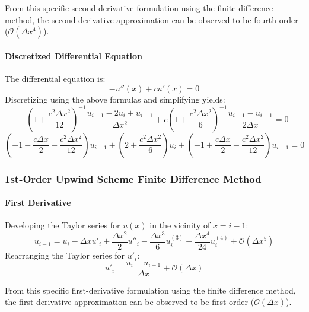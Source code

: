\documentclass[10pt, reqno]{article}		%
\numberwithin{equation}{section}
\begin{document}
From this specific second-derivative formulation using the finite difference method, the second-derivative approximation can be observed to be fourth-order ($\mathcal{O}(\Delta x^4)$).

\paragraph{Discretized Differential Equation}
The differential equation is:
\begin{equation}
- u''(x)+cu'(x)=0
\end{equation}
Discretizing using the above formulas and simplifying yields:
\begin{equation}
-\left(1 + \frac{c^2\Delta x^2}{12} \right)^{-1} \frac{u_{i+1} -2u_i + u_{i-1}}{\Delta x^2} + c\left(1 + \frac{c^2\Delta x^2}{6}\right)^{-1} \frac{u_{i+1} - u_{i-1}}{2\Delta x} = 0
\end{equation}
\begin{equation}
\left(-1-\frac{c\Delta x}{2}-\frac{c^2\Delta x^2}{12}\right)u_{i-1} + \left(2+\frac{c^2\Delta x^2}{6}\right)u_{i} + \left(-1+\frac{c\Delta x}{2}-\frac{c^2\Delta x^2}{12}\right)u_{i+1} = 0
\end{equation}

\subsubsection{1st-Order Upwind Scheme Finite Difference Method}

\paragraph{First Derivative}
Developing the Taylor series for $u(x)$ in the vicinity of $x = i-1$:
\begin{equation}
u_{i-1} = u_i - \Delta x u'_i + \frac{\Delta x^2}{2} u''_i - \frac{\Delta x^3}{6} u^{(3)}_i + \frac{\Delta x^4}{24} u^{(4)}_i + \mathcal{O}(\Delta x^5)
\end{equation}
Rearranging the Taylor series for $u'_i$:
\begin{equation}
u'_i = \frac{u_i - u_{i-1}}{\Delta x}  + \mathcal{O}(\Delta x)
\end{equation}

From this specific first-derivative formulation using the finite difference method, the first-derivative approximation can be observed to be first-order ($\mathcal{O}(\Delta x)$).
\end{document}
